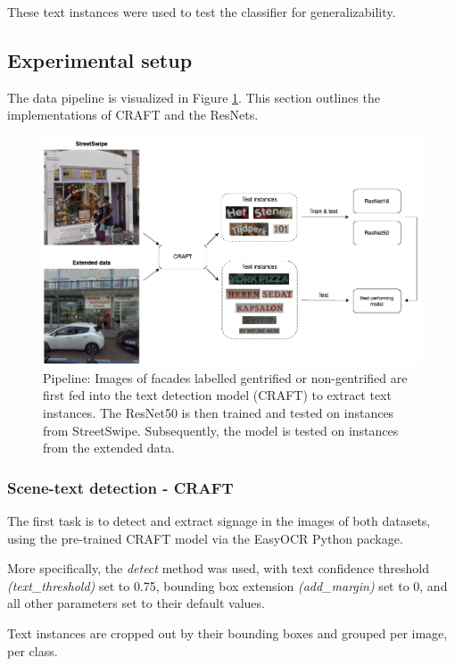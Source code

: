 These text instances were used to test the classifier for generalizability.


\subsection{Experimental setup}

The data pipeline is visualized in Figure \ref{fig:pipeline}. This section outlines the implementations of CRAFT and the ResNets.

\begin{figure}[]
    \centering
    \includegraphics[width=\textwidth]{media/methodology/Pipeline2.png}
    \caption{Pipeline: Images of facades labelled gentrified or non-gentrified are first fed into the text detection model (CRAFT) to extract text instances. The ResNet50 is then trained and tested on instances from StreetSwipe. Subsequently, the model is tested on instances from the extended data.}
    \label{fig:pipeline}
\end{figure}


\subsubsection{Scene-text detection - CRAFT}

The first task is to detect and extract signage in the images of both datasets, using the pre-trained CRAFT model via the EasyOCR Python package.

More specifically, the \textit{detect} method was used, with text confidence threshold \textit{(text\_threshold)} set to 0.75, bounding box extension \textit{(add\_margin)} set to 0, and all other parameters set to their default values.

Text instances are cropped out by their bounding boxes and grouped per image, per class. 


